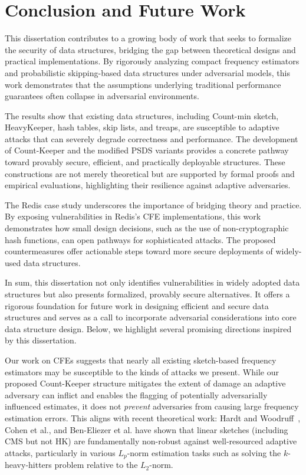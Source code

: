 \chapter{Conclusion and Future Work}\label{chap:conclusion}

This dissertation contributes to a growing body of work that seeks to formalize the security of data structures, bridging the gap between theoretical designs and practical implementations. By rigorously analyzing compact frequency estimators and probabilistic skipping-based data structures under adversarial models, this work demonstrates that the assumptions underlying traditional performance guarantees often collapse in adversarial environments.

The results show that existing data structures, including Count-min sketch, HeavyKeeper, hash tables, skip lists, and treaps, are susceptible to adaptive attacks that can severely degrade correctness and performance. The development of Count-Keeper and the modified PSDS variants provides a concrete pathway toward provably secure, efficient, and practically deployable structures. These constructions are not merely theoretical but are supported by formal proofs and empirical evaluations, highlighting their resilience against adaptive adversaries.

The Redis case study underscores the importance of bridging theory and practice. By exposing vulnerabilities in Redis’s CFE implementations, this work demonstrates how small design decisions, such as the use of non-cryptographic hash functions, can open pathways for sophisticated attacks. The proposed countermeasures offer actionable steps toward more secure deployments of widely-used data structures.

In sum, this dissertation not only identifies vulnerabilities in widely adopted data structures but also presents formalized, provably secure alternatives. It offers a rigorous foundation for future work in designing efficient and secure data structures and serves as a call to incorporate adversarial considerations into core data structure design. Below, we highlight several promising directions inspired by this dissertation.

Our work on CFEs suggests that nearly all existing sketch-based frequency estimators may be susceptible to the kinds of attacks we present. While our proposed Count-Keeper structure mitigates the extent of damage an adaptive adversary can inflict and enables the flagging of potentially adversarially influenced estimates, it does not \emph{prevent} adversaries from causing large frequency estimation errors. This aligns with recent theoretical work: Hardt and Woodruff~\cite{hardt2013}, Cohen et al.\cite{cohen2022robust}, and Ben-Eliezer et al.\cite{BenEliezer2022} have shown that linear sketches (including CMS but not HK) are fundamentally non-robust against well-resourced adaptive attacks, particularly in various $L_p$-norm estimation tasks such as solving the $k$-heavy-hitters problem relative to the $L_2$-norm.

